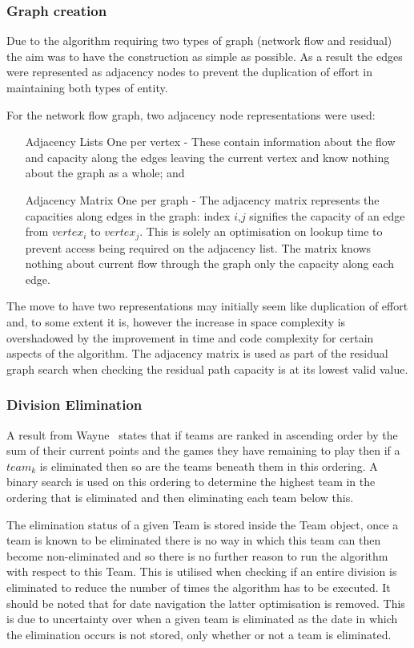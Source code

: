 \subsubsection{Graph creation}

Due to the algorithm requiring two types of graph (network flow and residual)
the aim was to have the construction as simple as possible. As a result the
edges were represented as adjacency nodes to prevent the duplication of effort
in maintaining both types of entity.

For the network flow graph, two adjacency node representations were
used:
\begin{itemize}
\item[Adjacency Lists] One per vertex - These contain information
  about the flow and capacity along the edges leaving the current
  vertex and know nothing about the graph as a whole; and  
\item[Adjacency Matrix] One per graph - The adjacency matrix
  represents the capacities along edges in the graph: index $i$,$j$
  signifies the capacity of an edge from $vertex_i$ to
  $vertex_j$. This is solely an optimisation on lookup time to prevent
  access being required on the adjacency list. The matrix knows
  nothing about current flow through the graph only the capacity along
  each edge.
\end{itemize}

The move to have two representations may initially seem
like duplication of effort and, to some extent it is, however the increase in
space complexity is overshadowed by the improvement in time and code complexity
for certain aspects of the algorithm. The adjacency matrix is used as part of
the residual graph search when checking the residual path capacity is at its
lowest valid value.

\subsubsection{Division Elimination}
A result from Wayne~\cite[p.~227]{Wayne} states that if teams are ranked in
ascending order by the sum of their current points and the
games they have remaining to play then if a $team_k$ is eliminated
then so are the teams beneath them in this ordering. A binary search
is used on this ordering to determine the highest team in the ordering
that is eliminated and then eliminating each team below this. 

The elimination status of a given Team is stored inside the Team
object, once a team is known to be eliminated there is no way in which
this team can then become non-eliminated and so there is no further
reason to run the algorithm with respect to this Team. This is utilised
when checking if an entire division is eliminated to reduce the number
of times the algorithm has to be executed. It should be noted that for
date navigation the latter optimisation is removed. This is due to
uncertainty over when a given team is eliminated as the date in which the
elimination occurs is not stored, only whether or not a team is
eliminated. 
